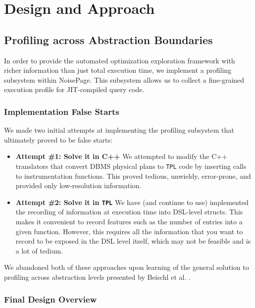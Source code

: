 \documentclass{vldb}
\newcommand{\tpl}{\texttt{TPL}\xspace}
\begin{document}

\section{Design and Approach}

\subsection{Profiling across Abstraction Boundaries}

In order to provide the automated optimization exploration framework with richer information than just total execution time, we implement a profiling subsystem within NoisePage. This subsystem allows us to collect a fine-grained execution profile for JIT-compiled query code.

\subsubsection{Implementation False Starts}

We made two initial attempts at implementing the profiling subsystem that ultimately proved to be false starts:

\begin{itemize}
    \item \textbf{Attempt \#1: Solve it in C++} We attempted to modify the C++ translators that convert DBMS physical plans to \tpl code by inserting calls to instrumentation functions. This proved tedious, unwieldy, error-prone, and provided only low-resolution information. 
    \item \textbf{Attempt \#2: Solve it in \tpl} We have (and continue to use) implemented the recording of information at execution time into DSL-level structs. This makes it convenient to record features such as the number of entries into a given function. However, this requires all the information that you want to record to be exposed in the DSL level itself, which may not be feasible and is a lot of tedium.
\end{itemize}

We abandoned both of these approaches upon learning of the general solution to profiling across abstraction levels presented by Beischl et al. \cite{beischl21}.

\subsubsection{Final Design Overview}
\end{document}
